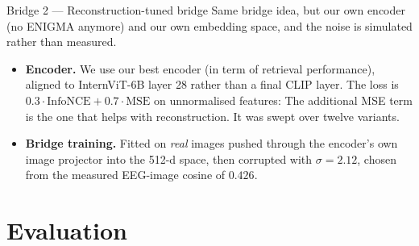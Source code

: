 \documentclass[aspectratio=169,10pt]{beamer}
\begin{document}
\begin{frame}{Bridge 2 --- Reconstruction-tuned bridge}
  \small
  Same bridge idea, but our own encoder (no ENIGMA anymore) and our own embedding space, and the noise is simulated
  rather than measured.

  \vspace{0.55em}
  \centering

  \vspace{0.55em}
  \begin{itemize}
    \item \textbf{Encoder.} We use our best encoder (in term of retrieval performance), aligned to InternViT-6B layer 28 rather than a final CLIP layer.
          The loss is $0.3\cdot\mathrm{InfoNCE}+0.7\cdot\mathrm{MSE}$ on unnormalised features:
          The additional MSE term is the one that helps with reconstruction. It was swept over twelve variants.
    \item \textbf{Bridge training.} Fitted on \emph{real} images pushed through the encoder's own
          image projector into the 512-d space, then corrupted with $\sigma=2.12$, chosen from the
          measured EEG-image cosine of $0.426$.
  \end{itemize}

\end{frame}

\section{Evaluation}
\end{document}
